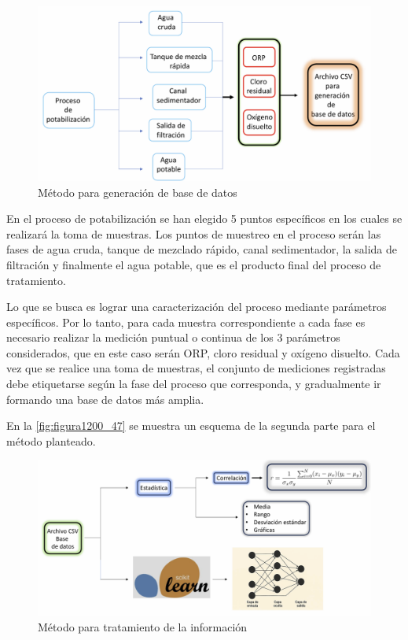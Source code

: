 

\begin{figure}[h]
	\centering
	\includegraphics[scale=0.75]{imgss217.png}
	\caption{Método para generación de base de datos}
	\label{fig:figura1200_1}
\end{figure}

En el proceso de potabilización se han elegido 5 puntos específicos en los cuales se realizará la toma de muestras. Los puntos de muestreo en el proceso serán las fases de agua cruda, tanque de mezclado rápido, canal sedimentador,
la salida de filtración y finalmente el agua potable, que es el producto final del proceso de tratamiento.

Lo que se busca es lograr una caracterización del proceso mediante parámetros específicos. Por lo tanto, para cada muestra correspondiente a cada fase es necesario realizar la medición puntual o continua de los 3 parámetros 
considerados, que en este caso serán ORP, cloro residual y oxígeno disuelto. Cada vez que se realice una toma de muestras, el conjunto de mediciones registradas debe etiquetarse según la fase del proceso que corresponda, y 
gradualmente ir formando una base de datos más amplia.

En la \autoref{fig:figura1200_47} se muestra un esquema de la segunda parte para el método planteado.

\clearpage

\begin{figure}[h]
	\centering
	\includegraphics[scale=0.65]{imgss218.png}
	\caption{Método para tratamiento de la información}
	\label{fig:figura1200_47}
\end{figure}

